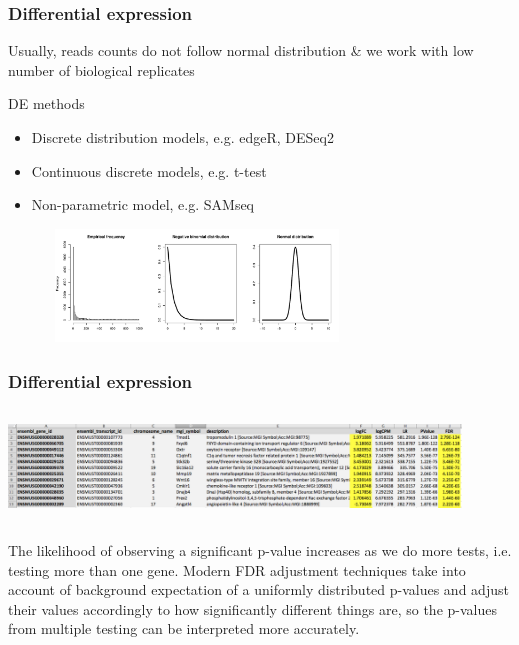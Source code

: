 \documentclass{beamer}\usepackage[]{graphicx}\usepackage[]{color}
\begin{document}
\begin{frame}
\frametitle{Differential expression}
\begin{displayquote}
Usually, reads counts do not follow normal distribution \& we work with low number of biological replicates
\end{displayquote}
\begin{block}{DE methods}
\begin{itemize}
\item Discrete distribution models, e.g. edgeR, DESeq2
\item Continuous discrete models, e.g. t-test
\item Non-parametric model, e.g. SAMseq 
\end{itemize}
\end{block}
\begin{center}
\includegraphics[width=10cm, height=3cm]{Images/DE_distribution.pdf}
\end{center}
\end{frame}


\begin{frame}
\frametitle{Differential expression}
\vspace{1cm}
\begin{center}
\includegraphics[width=12cm, height=3cm]{Images/DE_table.png}
\end{center}
\begin{displayquote}
\footnotesize
The likelihood of observing a significant p-value increases as we do more tests, i.e. testing more than one gene. Modern FDR adjustment techniques take into account of background expectation of a uniformly distributed p-values and adjust their values accordingly to how significantly different things are, so the p-values from multiple testing can be interpreted more accurately. 
\end{displayquote}
\end{frame}
\end{document}
